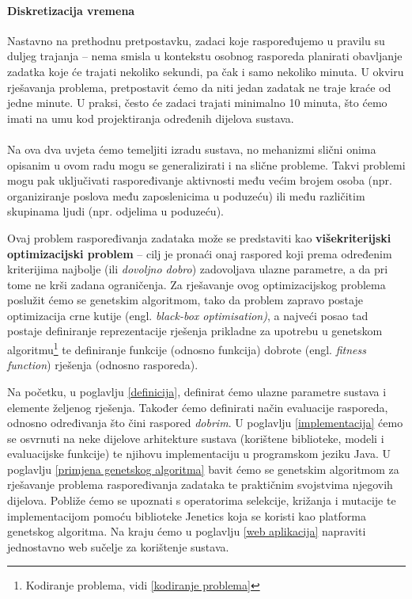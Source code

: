 \documentclass[times, utf8, zavrsni]{fer}
\begin{document}
\paragraph{Diskretizacija vremena} Nastavno na prethodnu pretpostavku, zadaci koje raspoređujemo u pravilu su duljeg trajanja -- nema smisla u kontekstu osobnog rasporeda planirati obavljanje zadatka koje će trajati nekoliko sekundi, pa čak i samo nekoliko minuta. U okviru rješavanja problema, pretpostavit ćemo da niti jedan zadatak ne traje kraće od jedne minute. U praksi, često će zadaci trajati minimalno 10 minuta, što ćemo imati na umu kod projektiranja određenih dijelova sustava.

\paragraph{}

Na ova dva uvjeta ćemo temeljiti izradu sustava, no mehanizmi slični onima opisanim u ovom radu mogu se generalizirati i na slične probleme. Takvi problemi mogu pak uključivati raspoređivanje aktivnosti među većim brojem osoba (npr. organiziranje poslova među zaposlenicima u poduzeću) ili među različitim skupinama ljudi (npr. odjelima u poduzeću).

Ovaj problem raspoređivanja zadataka može se predstaviti kao \textbf{višekriterijski optimizacijski problem} -- cilj je pronaći onaj raspored koji prema određenim kriterijima najbolje (ili \textit{dovoljno dobro}) zadovoljava ulazne parametre, a da pri tome ne krši zadana ograničenja. Za rješavanje ovog optimizacijskog problema poslužit ćemo se genetskim algoritmom, tako da problem zapravo postaje optimizacija crne kutije (engl. \textit{black-box optimisation)}, a najveći posao tad postaje definiranje reprezentacije rješenja prikladne za upotrebu u genetskom algoritmu\footnote{Kodiranje problema, vidi \ref{kodiranje problema}} te definiranje funkcije (odnosno funkcija) dobrote (engl. \textit{fitness function}) rješenja (odnosno rasporeda).

Na početku, u poglavlju \ref{definicija}, definirat ćemo ulazne parametre sustava i elemente željenog rješenja. Također ćemo definirati način evaluacije rasporeda, odnosno određivanja što čini raspored \textit{dobrim}. U poglavlju \ref{implementacija} ćemo se osvrnuti na neke dijelove arhitekture sustava (korištene biblioteke, modeli i evaluacijske funkcije) te njihovu implementaciju u programskom jeziku Java. U poglavlju \ref{primjena genetskog algoritma} bavit ćemo se genetskim algoritmom za rješavanje problema raspoređivanja zadataka te praktičnim svojstvima njegovih dijelova. Pobliže ćemo se upoznati s operatorima selekcije, križanja i mutacije te implementacijom pomoću biblioteke Jenetics koja se koristi kao platforma genetskog algoritma. Na kraju ćemo u poglavlju \ref{web aplikacija} napraviti jednostavno web sučelje za korištenje sustava.%
\end{document}
